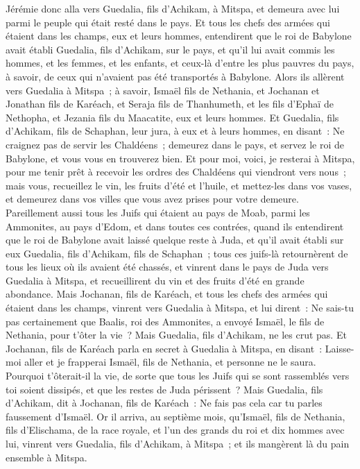 \begin{multicols}{2}
Jérémie donc alla vers Guedalia, fils d'Achikam, à Mitspa, et demeura avec lui parmi le peuple qui était resté dans le pays.
Et tous les chefs des armées qui étaient dans les champs, eux et leurs hommes, entendirent que le roi de Babylone avait établi Guedalia, fils d'Achikam, sur le pays, et qu'il lui avait commis les hommes, et les femmes, et les enfants, et ceux-là d'entre les plus pauvres du pays, à savoir, de ceux qui n'avaient pas été transportés à Babylone.
Alors ils allèrent vers Guedalia à Mitspa~; à savoir, Ismaël fils de Nethania, et Jochanan et Jonathan fils de Karéach, et Seraja fils de Thanhumeth, et les fils d'Ephaï de Nethopha, et Jezania fils du Maacatite, eux et leurs hommes.
Et Guedalia, fils d'Achikam, fils de Schaphan, leur jura, à eux et à leurs hommes, en disant~: Ne craignez pas de servir les Chaldéens~; demeurez dans le pays, et servez le roi de Babylone, et vous vous en trouverez bien.
Et pour moi, voici, je resterai à Mitspa, pour me tenir prêt à recevoir les ordres des Chaldéens qui viendront vers nous~; mais vous, recueillez le vin, les fruits d'été et l'huile, et mettez-les dans vos vases, et demeurez dans vos villes que vous avez prises pour votre demeure.
Pareillement aussi tous les Juifs qui étaient au pays de Moab, parmi les Ammonites, au pays d'Edom, et dans toutes ces contrées, quand ils entendirent que le roi de Babylone avait laissé quelque reste à Juda, et qu'il avait établi sur eux Guedalia, fils d'Achikam, fils de Schaphan~;
tous ces juifs-là retournèrent de tous les lieux où ils avaient été chassés, et vinrent dans le pays de Juda vers Guedalia à Mitspa, et recueillirent du vin et des fruits d'été en grande abondance.
Mais Jochanan, fils de Karéach, et tous les chefs des armées qui étaient dans les champs, vinrent vers Guedalia à Mitspa,
et lui dirent~: Ne sais-tu pas certainement que Baalis, roi des Ammonites, a envoyé Ismaël, le fils de Nethania, pour t'ôter la vie~? Mais Guedalia, fils d'Achikam, ne les crut pas.
Et Jochanan, fils de Karéach parla en secret à Guedalia à Mitspa, en disant~: Laisse-moi aller et je frapperai Ismaël, fils de Nethania, et personne ne le saura. Pourquoi t'ôterait-il la vie, de sorte que tous les Juifs qui se sont rassemblés vers toi soient dissipés, et que les restes de Juda périssent~?
Mais Guedalia, fils d'Achikam, dit à Jochanan, fils de Karéach~: Ne fais pas cela car tu parles faussement d'Ismaël.
\VerseOne{}Or il arriva, au septième mois, qu'Ismaël, fils de Nethania, fils d'Elischama, de la race royale, et l'un des grands du roi et dix hommes avec lui, vinrent vers Guedalia, fils d'Achikam, à Mitspa~; et ils mangèrent là du pain ensemble à Mitspa.

\end{multicols}
